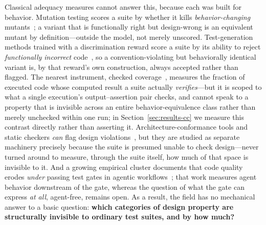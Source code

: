 \documentclass[conference]{IEEEtran}
\begin{document}
Classical adequacy measures cannot answer this, because each was built for behavior. Mutation testing scores a suite by whether it kills \emph{behavior-changing} mutants~\cite{jia2011analysis}; a variant that is functionally right but design-wrong is an equivalent mutant by definition---outside the model, not merely unscored. Test-generation methods trained with a discrimination reward score a suite by its ability to reject \emph{functionally incorrect} code~\cite{utrl}, so a convention-violating but behaviorally identical variant is, by that reward's own construction, always accepted rather than flagged. The nearest instrument, checked coverage~\cite{schuler2011checked}, measures the fraction of executed code whose computed result a suite actually \emph{verifies}---but it is scoped to what a single execution's output--assertion pair checks, and cannot speak to a property that is invisible across an entire behavior-equivalence class rather than merely unchecked within one run; in Section~\ref{sec:results-cc} we measure this contrast directly rather than asserting it. Architecture-conformance tools and static checkers \emph{can} flag design violations~\cite{murphy2001reflexion}, but they are studied as separate machinery precisely because the suite is presumed unable to check design---never turned around to measure, through the suite itself, how much of that space is invisible to it. And a growing empirical cluster documents that code quality erodes \emph{under} passing test gates in agentic workflows~\cite{slopcodebench,constraintdecay}; that work measures agent behavior downstream of the gate, whereas the question of what the gate can express \emph{at all}, agent-free, remains open. As a result, the field has no mechanical answer to a basic question: \textbf{which categories of design property are structurally invisible to ordinary test suites, and by how much?}
\end{document}
